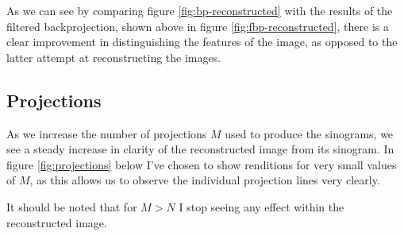 
As we can see by comparing figure \ref{fig:bp-reconstructed} with the results
of the filtered backprojection, shown above in figure
\ref{fig:fbp-reconstructed}, there is a clear improvement in distinguishing
the features of the image, as opposed to the latter attempt at reconstructing
the images. 

\subsection{Projections}
As we increase the number of projections $M$ used to produce the sinograms, we
see a steady increase in clarity of the reconstructed image from its sinogram.
In figure \ref{fig:projections} below I've chosen to show renditions for very
small values of $M$, as this allows us to observe the individual projection
lines very clearly.


It should be noted that for $M > N$ I stop seeing any effect within the
reconstructed image.
